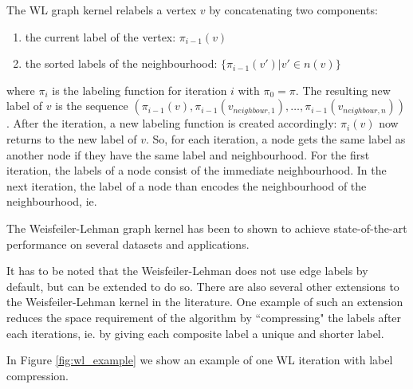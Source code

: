 The WL graph kernel relabels a vertex $v$ by concatenating two components:
\begin{enumerate}
    \item{the current label of the vertex: $\pi_{i-1}(v)$}
    \item{the sorted labels of the neighbourhood: $\{ \pi_{i-1}(v') | v' \in n(v) \}$}
\end{enumerate}
where $\pi_{i}$ is the labeling function for iteration $i$ with $\pi_0 = \pi$.
The resulting new label of $v$ is the sequence $(\pi_{i-1}(v), \pi_{i-1}(v_{neighbour,1}), \dots , \pi_{i-1}(v_{neighbour,n}))$.
After the iteration, a new labeling function is created accordingly: $\pi_i(v)$ now returns to the new label of $v$.
So, for each iteration, a node gets the same label as another node if they have the same label and neighbourhood.
For the first iteration, the labels of a node consist of the immediate neighbourhood.
In the next iteration, the label of a node than encodes the neighbourhood of the neighbourhood, ie. 

The Weisfeiler-Lehman graph kernel has been to shown to achieve state-of-the-art performance on several datasets and applications.


It has to be noted that the Weisfeiler-Lehman does not use edge labels by default, but can be extended to do so.
There are also several other extensions to the Weisfeiler-Lehman kernel in the literature.
One example of such an extension reduces the space requirement of the algorithm by ``compressing" the labels after each iterations, ie. by giving each composite label a unique and shorter label.

In Figure \ref{fig:wl_example} we show an example of one WL iteration with label compression.


